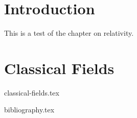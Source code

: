 \documentclass[12pt]{book}
\begin{document}
\chapter{Introduction}
This is a test of the chapter on relativity.

\chapter{Classical Fields}
{classical-fields.tex}

{bibliography.tex}
\end{document}
